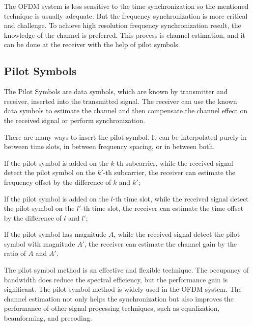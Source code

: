 The OFDM system is less sensitive to the time synchronization so the mentioned technique is usually adequate. But the frequency synchronization is more critical and challenge. To achieve high resolution frequency synchronization result, the knowledge of the channel is preferred. This process is channel estimation, and it can be done at the receiver with the help of pilot symbols.

\subsection{Pilot Symbols}
The Pilot Symbols are data symbols, which are known by transmitter and receiver, inserted into the transmitted signal. The receiver can use the known data symbols to estimate the channel and then compensate the channel effect on the received signal or perform synchronization.

There are many ways to insert the pilot symbol. It can be interpolated purely in between time slots, in between frequency spacing, or in between both.
\begin{enumerate*}[(i)]
    \item If the pilot symbol is added on the $k$-th subcarrier, while the received signal detect the pilot symbol on the $k'$-th subcarrier, the receiver can estimate the frequency offset by the difference of $k$ and $k'$;
    \item If the pilot symbol is added on the $l$-th time slot, while the received signal detect the pilot symbol on the $l'$-th time slot, the receiver can estimate the time offset by the difference of $l$ and $l'$;
    \item If the pilot symbol has magnitude $A$, while the received signal detect the pilot symbol with magnitude $A'$, the receiver can estimate the channel gain by the ratio of $A$ and $A'$.
\end{enumerate*}

The pilot symbol method is an effective and flexible technique. The occupancy of bandwidth does reduce the spectral efficiency, but the performance gain is significant. The pilot symbol method is widely used in the OFDM system. The channel estimation not only helps the synchronization but also improves the performance of other signal processing techniques, such as equalization, beamforming, and precoding.